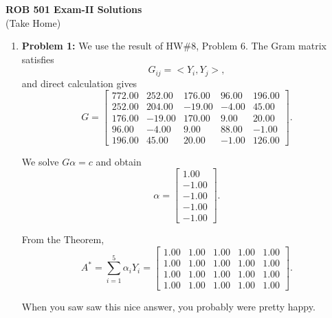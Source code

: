 \documentclass[letterpaper]{article}
\begin{document}
\newcommand{\trace}{\mathrm{trace}}
\newcommand{\real}{\mathbb R}  %
\newcommand{\nat}{\mathbb R}   %
\newcommand{\cp}{\mathbb C}    %
\newcommand{\ds}{\displaystyle}
\newcommand{\mf}[2]{\frac{\ds #1}{\ds #2}}
\newcommand{\book}[2]{{Luenberger, Page~#1, }{Prob.~#2}}
\newcommand{\spanof}[1]{\textrm{span} \{ #1 \}}
  \newcommand{\Covof}[2]{ \mathrm{cov} \left(#1,#2\right)}
\parindent 0pt


\begin{center}
{\large \bf ROB 501 Exam-II Solutions}\\
(Take Home)
\end{center}

\vspace*{1cm}

\begin{enumerate}
\item \noindent \textbf{Problem 1:} We use the result of HW\#8, Problem 6. The Gram matrix satisfies
$$G_{ij} = <Y_i,Y_j>,$$
and direct calculation gives
$$G = \left[ \begin{array}{rrrrr}772.00& 252.00& 176.00& 96.00& 196.00\\252.00& 204.00& -19.00& -4.00& 45.00\\176.00& -19.00& 170.00& 9.00& 20.00\\96.00& -4.00& 9.00& 88.00& -1.00\\196.00& 45.00& 20.00& -1.00& 126.00\end{array} \right].$$

We solve $G \alpha = c$ and obtain
$$\alpha = \left[ \begin{array}{r}1.00\\-1.00\\-1.00\\-1.00\\-1.00\end{array} \right] .$$

From the Theorem, $$A^* = \sum_{i=1}^{5} \alpha_i Y_i = \left[ \begin{array}{rrrrr}1.00& 1.00& 1.00& 1.00& 1.00\\1.00& 1.00& 1.00& 1.00& 1.00\\1.00& 1.00& 1.00& 1.00& 1.00\\1.00& 1.00& 1.00& 1.00& 1.00\end{array} \right].$$

When you saw saw this nice answer, you probably were pretty happy.


\end{enumerate}
\end{document}
